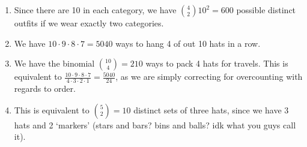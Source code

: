 \begin{enumerate}
\begin{enumerate}
        \item Since there are 10 in each category, we have $\binom{4}{2}10^2 = 600$ possible distinct outfits if we wear exactly two categories.
        
        \item We have $10 \cdot 9 \cdot 8 \cdot 7 = 5040$ ways to hang 4 of out 10 hats in a row.
        
        \item We have the binomial $\binom{10}{4} = 210$ ways to pack 4 hats for travels. This is equivalent to $\frac{10 \cdot 9 \cdot 8 \cdot 7}{4 \cdot 3 \cdot 2 \cdot 1} = \frac{5040}{24}$, as we are simply correcting for overcounting with regards to order.
        
        \item This is equivalent to $\binom{5}{2} = 10$ distinct sets of three hats, since we have 3 hats and 2 `markers' (stars and bars? bins and balls? idk what you guys call it).
    \end{enumerate}
\end{enumerate}
